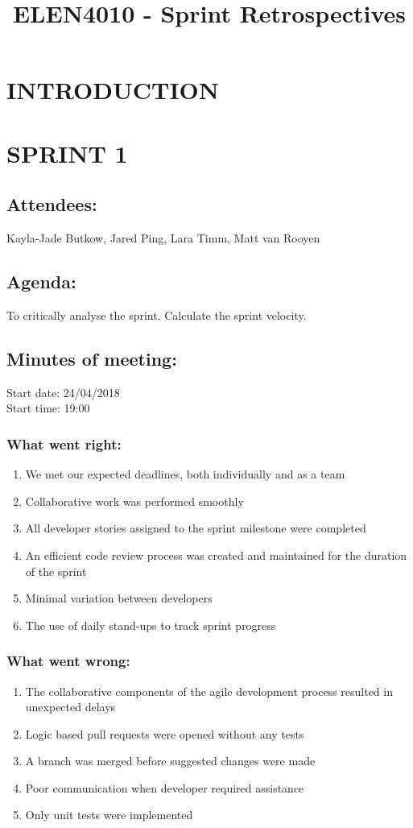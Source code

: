\documentclass[10pt,onecolumn]{witseiepaper}
\title{ELEN4010 - Sprint Retrospectives}
\author{}
\begin{document}
\maketitle
\pagestyle{plain}
\setcounter{page}{1}

\section{INTRODUCTION}

\section*{SPRINT 1}
\subsection*{Attendees:}
Kayla-Jade Butkow, Jared Ping, Lara Timm, Matt van Rooyen
\subsection*{Agenda:} 
To critically analyse the sprint. Calculate the sprint velocity.

\subsection*{Minutes of meeting:}
Start date: 24/04/2018 \\
Start time: 19:00

\subsubsection*{What went right:}
\begin{enumerate}
	\item We met our expected deadlines, both individually and as a team
	\item Collaborative work was performed smoothly
	\item All developer stories assigned to the sprint milestone were completed
	\item An efficient code review process was created and maintained for the duration of the sprint
	\item Minimal variation between developers 
	\item The use of daily stand-ups to track sprint progress
\end{enumerate}

\subsubsection*{What went wrong:}
\begin{enumerate}
	\item The collaborative components of the agile development process resulted in unexpected delays
	\item Logic based pull requests were opened without any tests
	\item A branch was merged before suggested changes were made
	\item Poor communication when developer required assistance
	\item Only unit tests were implemented 
\end{enumerate}
\end{document}
